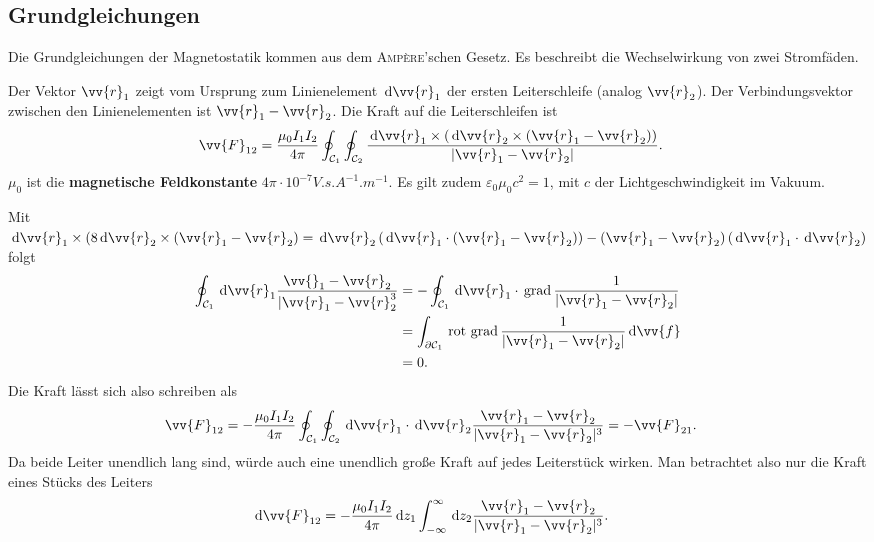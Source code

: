 \documentclass[a4paper,12pt]{article}
\newcommand{\td}{\,\text{d}}
\numberwithin{equation}{section}
\begin{document}
\subsection{Grundgleichungen}
Die Grundgleichungen der Magnetostatik kommen aus dem \textsc{Amp\`ere}'schen Gesetz. Es beschreibt die Wechselwirkung von zwei Stromfäden.\par
Der Vektor $\vv{r}_1$ zeigt vom Ursprung zum Linienelement $\td \vv{r}_1$ der ersten Leiterschleife (analog $\vv{r}_2$). Der Verbindungsvektor zwischen den Linienelementen ist $\vv{r}_1-\vv{r}_2$.
Die Kraft auf die Leiterschleifen ist
\begin{align} 
        \vv{F}_{12}&=\dfrac{\mu _0I_1I_2}{4\pi }\oint_{\mathcal{C}_1}^{}\oint_{\mathcal{C}_2}^{}\dfrac{\td \vv{r}_1\times \left(\td \vv{r}_2\times \left(\vv{r}_1-\vv{r}_2\right)\right)}{|\vv{r}_1-\vv{r}_2|}
.\end{align} 
$\mu _0$ ist die \textbf{magnetische Feldkonstante} $4\pi \cdot 10^{-7}\unit{V.s.A^{-1}.m^{-1}}$.
Es gilt zudem $\varepsilon _0\mu _0c^2=1$, mit $c$ der Lichtgeschwindigkeit im Vakuum.\par
Mit $\td \vv{r}_1\times (8\td \vv{r}_2\times \left(\vv{r}_1-\vv{r}_2\right)=\td \vv{r}_2\left(\td \vv{r}_1\cdot \left(\vv{r}_1-\vv{r}_2\right)\right)-\left(\vv{r}_1-\vv{r}_2\right)\left(\td \vv{r}_1\cdot \td \vv{r}_2\right)$ folgt
\begin{align} 
        \oint_{\mathcal{C}_1}^{}\td \vv{r}_1\dfrac{\vv{}_1-\vv{r}_2}{|\vv{r}_1-\vv{r}_2^3}&=-\oint_{\mathcal{C}_1}^{}\td \vv{r}_1\cdot \,\text{grad}\,\dfrac{1}{|\vv{r}_1-\vv{r}_2|}\\
                                                                                          &=\int_{\partial \mathcal{C}_1}^{}\,\text{rot}\,\,\text{grad}\,\dfrac{1}{|\vv{r}_1-\vv{r}_2|}\td \vv{f}\\
                                                                                          &=0
.\end{align} 
Die Kraft lässt sich also schreiben als
\begin{align} 
        \vv{F}_{12}&=-\dfrac{\mu _0I_1I_2}{4\pi }\oint_{\mathcal{C}_1}^{}\oint_{\mathcal{C}_2}^{}\td \vv{r}_1\cdot \td \vv{r}_2\dfrac{\vv{r}_1-\vv{r}_2}{|\vv{r}_1-\vv{r}_2|^3}=-\vv{F}_{21}
.\end{align} 
Da beide Leiter unendlich lang sind, würde auch eine unendlich große Kraft auf jedes Leiterstück wirken.
Man betrachtet also nur die Kraft eines Stücks des Leiters
\begin{align} 
        \td \vv{F}_{12}&=-\dfrac{\mu _0I_1I_2}{4\pi }\td z_1\int_{-\infty}^{\infty}\td z_2\dfrac{\vv{r}_1-\vv{r}_2}{|\vv{r}_1-\vv{r}_2|^3}
.\end{align} 
\end{document}
